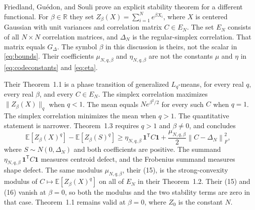 \documentclass[11pt]{article}
\theoremstyle{remark}\newtheorem{remark}[theorem]{Remark}
\newcommand{\R}{\mathbb R}
\newcommand{\E}{\mathbb E}
\newcommand{\one}{\mathbf 1}
\newcommand{\norm}[1]{\left\lVert#1\right\rVert}
\begin{document}
Friedland, Gu\'edon, and Souli \cite{FGS} prove an explicit stability theorem
for a different functional. For $\beta\in\R$ they set
$Z_\beta(X)=\sum_{i=1}^N e^{\beta X_i}$, where $X$ is centered Gaussian with
unit variances and correlation matrix $C\in E_N$. The set $E_N$ consists of
all $N\times N$ correlation matrices, and $\Delta_N$ is the regular-simplex
correlation. That matrix equals $G_\Delta$. The symbol $\beta$ in this
discussion is theirs, not the scalar in \eqref{eq:bounds}. Their coefficients
$\mu_{N,q,\beta}$ and $\eta_{N,q,\beta}$ are not the constants $\mu$ and
$\eta$ in \eqref{eq:codeconstants} and \eqref{eq:eta}.

Their Theorem~1.1 is a phase transition of generalized $L_q$-means, for every
real $q$, every real $\beta$, and every $C\in E_N$. The simplex correlation
maximizes $\|Z_\beta(X)\|_q$ when $q<1$. The mean equals $N e^{\beta^2/2}$
for every such $C$ when $q=1$. The simplex correlation minimizes the mean
when $q>1$. The quantitative statement is narrower. Theorem~1.3 requires
$q>1$ and $\beta\neq 0$, and concludes
\[
 \E[Z_\beta(X)^q]-\E[Z_\beta(S)^q]
 \ge \eta_{N,q,\beta}\,\one^{\mathsf T}C\one
  +\frac{\mu_{N,q,\beta}}{2}\norm{C-\Delta_N}_F^2,
\]
where $S\sim N(0,\Delta_N)$ and both coefficients are positive. The summand
$\eta_{N,q,\beta}\,\one^{\mathsf T}C\one$ measures centroid defect, and the
Frobenius summand measures shape defect. The
same modulus $\mu_{N,q,\beta}$, their (15), is the strong-convexity modulus
of $C\mapsto\E[Z_\beta(X)^q]$ on all of $E_N$ in their Theorem~1.2. Their
(15) and (16) vanish at $\beta=0$, so both the modulus and the two stability
terms are zero in that case. Theorem~1.1 remains valid at $\beta=0$, where
$Z_0$ is the constant $N$.
\end{document}
